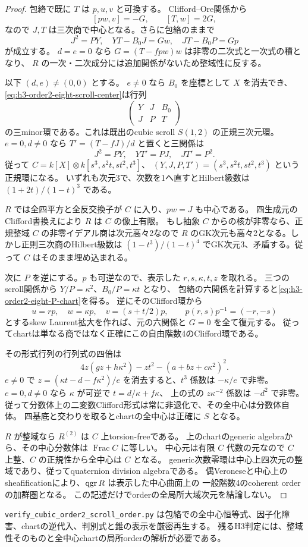 \begin{proof}
包絡で既に $T$ は $p,u,v$ と可換する。
Clifford--Ore関係から
\[
 [pw,v]=-G,\qquad[T,w]=2G,
\]
なので $J,T$ は三次商で中心となる。さらに包絡のままで
\[
 J^2=PY,\quad YT-B_0J=Gw,\quad JT-B_0P=Gp
\]
が成立する。
$d=e=0$ なら $G=(T-fpw)w$ は非零の二次式と一次式の積となり、
$R$ の一次・二次成分には追加関係がないため整域性に反する。

以下 $(d,e)\ne(0,0)$ とする。
$e\ne0$ なら $B_0$ を座標として $X$ を消去でき、
\eqref{eq:h3-order2-eight-scroll-center}は行列
\[
 \begin{pmatrix}Y&J&B_0\\J&P&T\end{pmatrix}
\]
の三minor環である。これは既出のcubic scroll $S(1,2)$ の正規三次元環。
$e=0,d\ne0$ なら $T'=(T-fJ)/d$ と置くと三関係は
\[
 J^2=PY,\quad YT'=PJ,\quad JT'=P^2.
\]
従って $C=k[X]\otimes k[s^3,s^2t,st^2,t^3]$、
$(Y,J,P,T')=(s^3,s^2t,st^2,t^3)$ という正規環になる。
いずれも次元3で、次数を1へ直すとHilbert級数は $(1+2t)/(1-t)^3$ である。

$R$ では全四平方と全反交換子が $C$ に入り、$pw=J$ も中心である。
四生成元のClifford書換えにより $R$ は $C$ の像上有限。
もし抽象 $C$ からの核が非零なら、正規整域 $C$ の非零イデアル商は次元高々2なので
$R$ のGK次元も高々2となる。しかし正則三次商のHilbert級数は
$(1-t^3)/(1-t)^4$ でGK次元3、矛盾する。従って $C$ はそのまま埋め込まれる。

次に $P$ を逆にする。$p$ も可逆なので、表示した $r,s,\kappa,t,z$ を取れる。
三つのscroll関係から $Y/P=\kappa^2$、$B_0/P=\kappa t$ となり、
包絡の六関係を計算すると\eqref{eq:h3-order2-eight-P-chart}を得る。
逆にそのClifford環から
\[
 u=rp,\quad w=\kappa p,\quad v=(s+t/2)p,\qquad
 p(r,s)p^{-1}=(-r,-s)
\]
とするskew Laurent拡大を作れば、元の六関係と $G=0$ を全て復元する。
従ってchartは単なる商ではなく正確にこの自由階数4のClifford環である。

その形式行列の行列式の四倍は
\begin{equation}\label{eq:h3-order2-eight-local-discriminant}
 4z(gz+h\kappa^2)-zt^2-(a+bz+c\kappa^2)^2.
\end{equation}
$e\ne0$ で $z=(\kappa t-d-f\kappa^2)/e$ を消去すると、$t^3$ 係数は $-\kappa/e$ で非零。
$e=0,d\ne0$ なら $\kappa$ が可逆で $t=d/\kappa+f\kappa$、
上の式の $z\kappa^{-2}$ 係数は $-d^2$ で非零。
従って分数体上の二変数Clifford形式は常に非退化で、その全中心は分数体自体。
四基底と交わりを取るとchartの全中心は正確に $S$ となる。

$R$ が整域なら $R^{(2)}$ は $C$ 上torsion-freeである。
上のchartのgeneric algebraから、その中心分数体は $\operatorname{Frac}C$ に等しい。
中心元は有限 $C$ 代数の元なので $C$ 上整、$C$ の正規性から全中心は $C$ となる。
generic次数零環は中心上四次元の整域であり、従ってquaternion division algebraである。
偶Veroneseと中心上のsheafificationにより、$\operatorname{qgr} R$ は表示した中心曲面上の
一般階数4のcoherent orderの加群圏となる。
この記述だけでorderの全局所大域次元を結論しない。
\end{proof}
\texttt{verify\_\allowbreak{}cubic\_\allowbreak{}order2\_\allowbreak{}scroll\_\allowbreak{}order.py}
は包絡での全中心恒等式、因子化障害、chartの逆代入、判別式と錐の表示を厳密再生する。
残るH3判定には、整域性そのものと全中心chartの局所orderの解析が必要である。

